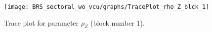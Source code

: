 \begin{figure}[H]
\centering
  \texttt{[image: BRS\_sectoral\_wo\_vcu/graphs/TracePlot\_rho\_Z\_blck\_1]}\\
    \caption{Trace plot for parameter ${\rho_Z}$ (block number 1).}
\end{figure}
